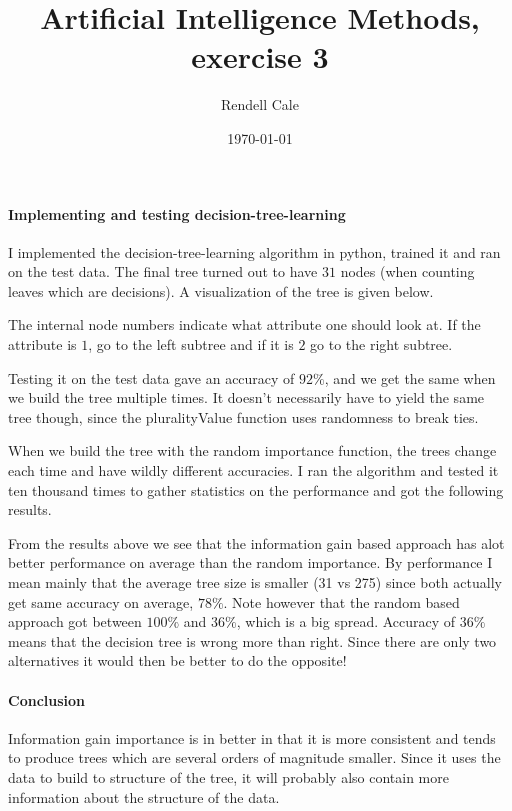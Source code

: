 \documentclass[a4paper,11pt]{article}
\title{Artificial Intelligence Methods, exercise 3}
\author{Rendell Cale}
\date{\today}
\begin{document}
\maketitle

\paragraph{Implementing and testing decision-tree-learning}
I implemented the decision-tree-learning algorithm in python, trained it and ran on the test data. The final tree turned out to have $31$ nodes (when counting leaves which are decisions). 
A visualization of the tree is given below.



The internal node numbers indicate what attribute one should look at. If the attribute is $1$, go to the left subtree and if it is $2$ go to the right subtree. 

Testing it on the test data gave an accuracy of $92 \%$, and we get the same when we build the tree multiple times. It doesn't necessarily have to yield the same tree though, since the pluralityValue function uses randomness to break ties. 

When we build the tree with the random importance function, the trees change each time and have wildly different accuracies. I ran the algorithm and tested it ten thousand times to gather statistics on the performance and got the following results.



From the results above we see that the information gain based approach has alot better performance on average than the random importance. By performance I mean mainly that the average tree size is smaller (31 vs 275) since both actually get same accuracy on average, $78 \%$. Note however that the random based approach got between $100 \%$ and $36 \%$, which is a big spread. Accuracy of $36 \%$ means that the decision tree is wrong more than right. Since there are only two alternatives it would then be better to do the opposite!

\paragraph{Conclusion}
Information gain importance is in better in that it is more consistent and tends to produce trees which are several orders of magnitude smaller. Since it uses the data to build to structure of the tree, it will probably also contain more information about the structure of the data. 
\end{document}
